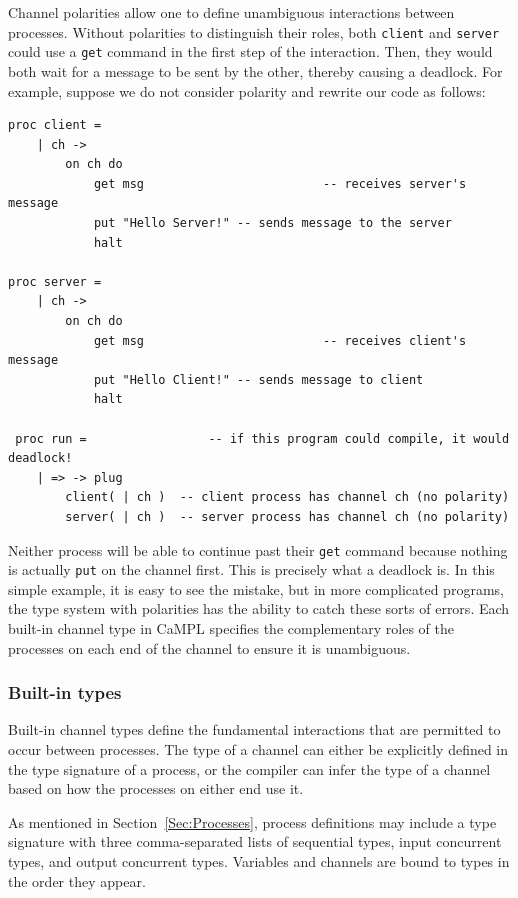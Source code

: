 \documentclass[acmsmall]{acmart}
\begin{document}
Channel polarities allow one to define unambiguous interactions between processes. 
Without polarities to distinguish their roles, both \lstinline$client$ and \lstinline$server$ could use a \lstinline$get$ command in the first step of the interaction.
Then, they would both wait for a message to be sent by the other, thereby causing a deadlock. 
For example, suppose we do not consider polarity and rewrite our code as follows:
\begin{lstlisting}[label=ex:ambiguityce, caption=Code without channel polarity (this code will not compile)] 
proc client = 
	| ch ->
		on ch do 
			get msg							-- receives server's message  
			put "Hello Server!"	-- sends message to the server      
			halt

proc server =  
	| ch ->
		on ch do
			get msg							-- receives client's message
			put "Hello Client!"	-- sends message to client
			halt

 proc run = 				-- if this program could compile, it would deadlock!
 	| => -> plug
 		client( | ch )	-- client process has channel ch (no polarity)
 		server( | ch )	-- server process has channel ch (no polarity)
\end{lstlisting}
Neither process will be able to continue past their \lstinline{get} command because nothing is actually \lstinline{put} on the channel first.
This is precisely what a deadlock is.
In this simple example, it is easy to see the mistake, but in more complicated programs, the type system with polarities has the ability to catch these sorts of errors.
Each built-in channel type in CaMPL specifies the complementary roles of the processes on each end of the channel to ensure it is unambiguous.


\subsubsection{Built-in types}
\label{Sec:channeltypes}

Built-in channel types define the fundamental interactions that are permitted to occur between processes.
The type of a channel can either be explicitly defined in the type signature of a process, or the compiler can infer the type of a channel based on how the processes on either end use it.

As mentioned in Section~\ref{Sec:Processes}, process definitions may include a type signature with three comma-separated lists of sequential types, input concurrent types, and output concurrent types.
Variables and channels are bound to types in the order they appear.
\end{document}

